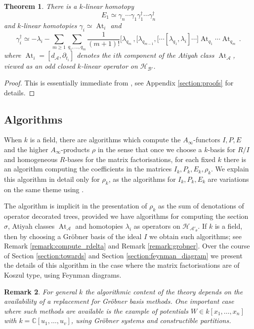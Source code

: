 \documentclass[english,letter paper,12pt,leqno]{article}
\newtheorem{theorem}{Theorem}[section]
\theoremstyle{example}
\newtheorem{remark}[theorem]{Remark}
\numberwithin{equation}{section}
\def\AA{\mathcal{A}}
\def\BB{\mathcal{B}}
\def\HH{\HH}
\def\HH{\mathcal{H}}
\def\be{\begin{equation}}
\def\ee{\end{equation}}
\DeclareMathOperator{\At}{At}
\DeclareMathOperator{\vAt}{At}
\begin{document}
\begin{theorem}\label{theorem:homotopy_clifford} There is a $k$-linear homotopy
\be
E_1 \simeq \gamma_n \cdots \gamma_1 \gamma_1^\dagger \cdots \gamma_n^\dagger
\ee
and $k$-linear homotopies $\gamma_i \simeq \vAt_i$ and
\be
\gamma_i^\dagger \simeq -\lambda_i - \sum_{m \ge 1} \sum_{q_1,\ldots,q_m} \frac{1}{(m+1)!} \big[ \lambda_{q_m}\,, \big[ \lambda_{q_{m-1}}, \big[ \cdots [ \lambda_{q_1}, \lambda_i ] \cdots \big] \At_{q_1} \cdots \At_{q_m}\,.
\ee
where $\vAt_i = [ d_{\AA}, \partial_{t_i} ]$ denotes the $i$th component of the Atiyah class $\vAt_{\AA}$, viewed as an odd closed $k$-linear operator on $\HH_{\BB'}$.
\end{theorem}
\begin{proof}
This is essentially immediate from \cite{cut}, see Appendix \ref{section:proofs} for details.
\end{proof}

\subsection{Algorithms}\label{section:the_algorithms}

When $k$ is a field, there are algorithms which compute the $A_\infty$-functors $I, P, E$ and the higher $A_\infty$-products $\rho$ in the sense that once we choose a $k$-basis for $R/I$ and homogeneous $R$-bases for the matrix factorisations, for each fixed $k$ there is an algorithm computing the coefficients in the matrices $I_k, P_k, E_k, \rho_k$. We explain this algorithm in detail only for $\rho_k$, as the algorithms for $I_k, P_k, E_k$ are variations on the same theme using \cite{markl_transfer}.

The algorithm is implicit in the presentation of $\rho_k$ as the sum of denotations of operator decorated trees, provided we have algorithms for computing the section $\sigma$, Atiyah classes $\vAt_{\AA}$ and homotopies $\lambda_i$ as operators on $\HH_{\AA'_\theta}$. If $k$ is a field, then by choosing a Gr\"obner basis of the ideal $I$ we obtain such algorithms; see Remark \ref{remark:compute_rdelta} and Remark \ref{remark:grobner}. Over the course of Section \ref{section:towards} and Section \ref{section:feynman_diagram} we present the details of this algorithm in the case where the matrix factorisations are of Koszul type, using Feynman diagrams.

\begin{remark} For general $k$ the algorithmic content of the theory depends on the availability of a replacement for Gr\"obner basis methods. One important case where such methods are available is the example of potentials $W \in k[x_1,\ldots,x_n]$ with $k = \mathbb{C}[u_1,\ldots,u_v]$, using Gr\"obner systems \cite{weispfenning} and constructible partitions.
\end{remark}
\end{document}
